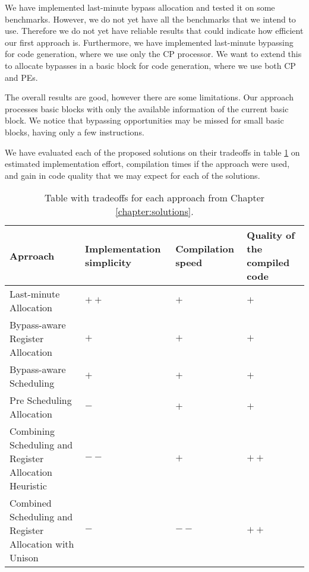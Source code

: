 We have implemented last-minute bypass allocation and tested it on some benchmarks. However, we do not yet have all the benchmarks that we intend to use. Therefore we do not yet have reliable results that could indicate how efficient our first approach is. Furthermore, we have implemented last-minute bypassing for code generation, where we use only the CP processor. We want to extend this to allocate bypasses in a basic block for code generation, where we use both CP and PEs.

The overall results are good, however there are some limitations. Our approach processes basic blocks with only the available information of the current basic block. We notice that bypassing opportunities may be missed for small basic blocks, having only a few instructions. %


We have evaluated each of the proposed solutions on their tradeoffs in table \ref{table:tradeoffs} on estimated implementation effort, compilation times if the approach were used, and gain in code quality that we may expect for each of the solutions. 

\begin{table}[h]
\caption{Table with tradeoffs for each approach from Chapter \ref{chapter:solutions}.}
\begin{center}
\begin{tabular}{@{}p{}p{}p{}p{}@{}}
\toprule
\textbf{Aprroach} 		& \textbf{Implementation simplicity} & \textbf{Compilation speed} & \textbf{Quality of the compiled code} \\ \hline
Last-minute Allocation  	& $++$ & $+$ & $+$ \\
Bypass-aware Register Allocation & $+$ & $+$ & $+$ \\
Bypass-aware Scheduling & $+$ & $+$ & $+$ \\
Pre Scheduling Allocation & $-$ & $+$ & $+$ \\
Combining Scheduling and Register Allocation Heuristic & $--$ & $+$ & $++$ \\
Combined Scheduling and Register Allocation with Unison & $-$ & $--$ & $++$ \\
\bottomrule
\end{tabular}
\end{center}
\label{table:tradeoffs}
\end{table}%